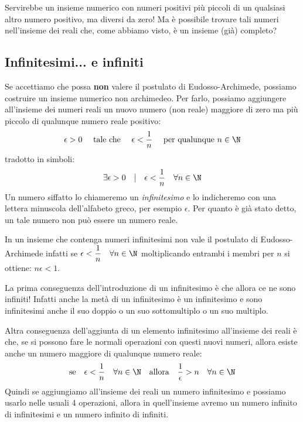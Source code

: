 Servirebbe un insieme numerico con numeri positivi più piccoli di un 
qualsiasi altro numero positivo, ma diversi da zero! Ma è possibile 
trovare tali numeri nell'insieme dei reali che, come abbiamo visto, 
è un insieme (già) completo?

\subsection{Infinitesimi... e infiniti}
\label{subsec:insnum_nonarchimedei}

Se accettiamo che possa \textbf{non} valere il postulato di 
Eudosso-Archimede, possiamo costruire un insieme numerico non archimedeo. 
Per farlo, possiamo aggiungere all'insieme dei numeri reali un nuovo numero 
(non reale) maggiore di zero ma più piccolo di qualunque numero reale 
positivo:
\[\epsilon > 0 \quad \text{ tale che } \quad 
\epsilon < \frac{1}{n} \quad \text{ per qualunque } n \in \N\]
tradotto in simboli:
\[\exists \epsilon > 0 \quad | \quad \epsilon < \frac{1}{n} \quad \forall n 
\in \N\]
Un numero siffatto lo chiameremo un \emph{infinitesimo} e lo indicheremo 
con una lettera minuscola dell'alfabeto greco, per esempio \(\epsilon\).
Per quanto è già stato detto, un tale numero non può essere un numero
reale. 
\begin{osservazione}
 In un insieme che contenga numeri infinitesimi non vale il postulato di 
Eudosso-Archimede infatti se
\(\epsilon < \dfrac{1}{n} \quad \forall n \in \N\) 
moltiplicando entrambi i membri per \(n\) 
si ottiene: \(n \epsilon < 1\).
\end{osservazione}

\vspace{1em}

La prima conseguenza dell'introduzione di un infinitesimo è che allora ce 
ne sono infiniti! 
Infatti anche la metà di un infinitesimo è un infinitesimo e 
sono infinitesimi anche il suo doppio o un suo sottomultiplo o un suo 
multiplo.

Altra conseguenza dell'aggiunta di un elemento infinitesimo all'insieme dei 
reali è che, se si possono fare le normali operazioni con questi nuovi 
numeri, allora esiste anche un numero maggiore di qualunque numero reale:
\[\text{se} \quad \epsilon < \frac{1}{n} \quad \forall n \in \N 
\quad \text{allora} \quad \frac{1}{\epsilon} > n \quad \forall n 
\in \N\]
Quindi se aggiungiamo all'insieme dei reali un numero infinitesimo e 
possiamo usarlo nelle usuali 4 operazioni, allora in quell'insieme avremo 
un numero infinito di infinitesimi e un numero infinito di infiniti.

